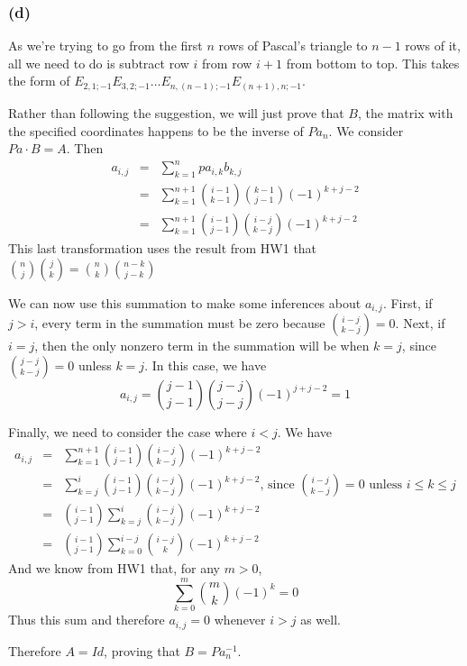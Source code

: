 \documentclass{article}
\begin{document}
\subsubsection{(d)}
As we're trying to go from the first $n$ rows of Pascal's triangle to $n-1$ rows
of it, all we need to do is subtract row $i$ from row $i+1$ from bottom to top.
This takes the form of
$E_{2,1;-1}E_{3,2;-1}\dots E_{n,(n-1); -1}E_{(n+1),n; -1}$.

\medskip
Rather than following the suggestion, we will just prove that $B$, the matrix with
the specified coordinates happens to be the inverse of $Pa_n$.
We consider $Pa\cdot B = A$. Then
\begin{eqnarray*}
  a_{i,j} &=& \sum_{k=1}^n pa_{i,k}b_{k,j}\\
  &=& \sum_{k=1}^{n+1} \binom{i-1}{k-1} \binom{k-1}{j-1}(-1)^{k + j - 2}\\
  &=& \sum_{k=1}^{n+1} \binom{i-1}{j-1}\binom{i-j}{k-j}(-1)^{k+j-2}
\end{eqnarray*}
This last transformation uses the result from HW1 that
$\binom{n}{j}\binom{j}{k} = \binom{n}{k}\binom{n-k}{j-k} $

We can now use this summation to make some inferences about $a_{i,j}$.
First, if $j > i$, every term in the summation must be zero because
$\binom{i-j}{k-j} = 0$.
Next, if $i = j$, then the only nonzero term in the summation will be when $k =
j$, since $\binom{j-j}{k-j} = 0$ unless $k = j$. In this case, we have
\[a_{i,j} = \binom{j-1}{j-1}\binom{j-j}{j-j}(-1)^{j+j-2} = 1\]

Finally, we need to consider the case where $i < j$. We have
\begin{eqnarray*}
a_{i,j} &=& \sum_{k=1}^{n+1} \binom{i-1}{j-1}\binom{i-j}{k-j}(-1)^{k+j-2}\\
 &=& \sum_{k=j}^{i} \binom{i-1}{j-1}\binom{i-j}{k-j}(-1)^{k+j-2}
 \textrm{, since } \binom{i-j}{k-j} = 0 \textrm{ unless } i \leq k \leq j\\
 &=& \binom{i-1}{j-1}\sum_{k=j}^{i} \binom{i-j}{k-j}(-1)^{k+j-2}\\
 &=& \binom{i-1}{j-1}\sum_{k=0}^{i-j} \binom{i-j}{k}(-1)^{k+j-2}
\end{eqnarray*}
And we know from HW1 that, for any $m > 0$,
\[ \sum_{k=0}^{m} \binom{m}{k}(-1)^k = 0\]
Thus this sum and therefore $a_{i,j} = 0$ whenever $i > j$ as well.

Therefore $A = Id$, proving that $B = Pa_n^{-1}$.
\end{document}
